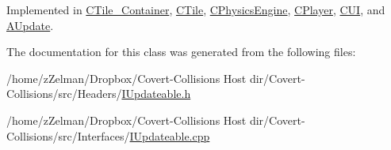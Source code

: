 Implemented in \hyperlink{classCTile__Container_abe6e19de544f042671094697bb83fde9}{C\-Tile\-\_\-\-Container}, \hyperlink{classCTile_a818a17e48a7219eedac950b82c641ee0}{C\-Tile}, \hyperlink{classCPhysicsEngine_abc493897bbdb15e6787a25478730f1f5}{C\-Physics\-Engine}, \hyperlink{classCPlayer_aa77025c046956b109a76d53c12a80fa5}{C\-Player}, \hyperlink{classCUI_ab0b322040b41a6650bd625216f77b75c}{C\-U\-I}, and \hyperlink{classAUpdate_a9f5be387e467fc5eea7fc45882abd949}{A\-Update}.



The documentation for this class was generated from the following files\-:\begin{DoxyCompactItemize}
\item 
/home/z\-Zelman/\-Dropbox/\-Covert-\/\-Collisions Host dir/\-Covert-\/\-Collisions/src/\-Headers/\hyperlink{IUpdateable_8h}{I\-Updateable.\-h}\item 
/home/z\-Zelman/\-Dropbox/\-Covert-\/\-Collisions Host dir/\-Covert-\/\-Collisions/src/\-Interfaces/\hyperlink{IUpdateable_8cpp}{I\-Updateable.\-cpp}\end{DoxyCompactItemize}
